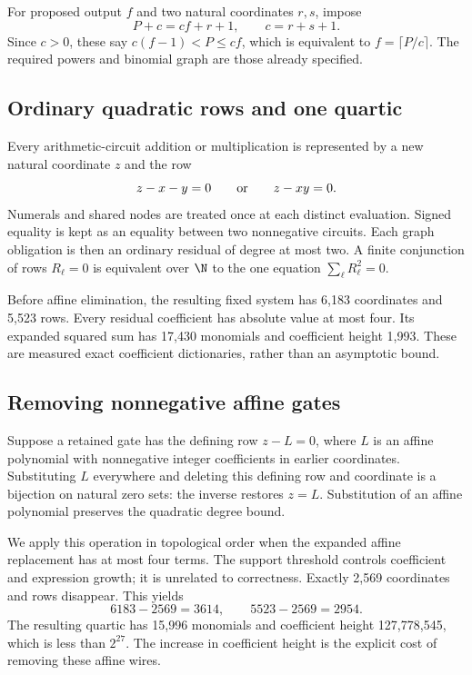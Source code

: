 For proposed output $f$ and two natural coordinates $r,s$, impose
\[
 P+c=cf+r+1,\qquad c=r+s+1.
\]
Since $c>0$, these say $c(f-1)<P\le cf$, which is equivalent to
$f=\lceil P/c\rceil$. The required powers and binomial graph are those
already specified.

\subsection{Ordinary quadratic rows and one quartic}

Every arithmetic-circuit addition or multiplication is represented by a
new natural coordinate $z$ and the row
\[
 z-x-y=0\qquad\hbox{or}\qquad z-xy=0.
\]
Numerals and shared nodes are treated once at each distinct evaluation.
Signed equality is kept as an equality between two nonnegative
circuits. Each graph obligation is then an ordinary residual of degree
at most two. A finite conjunction of rows $R_\ell=0$ is equivalent over
$\N$ to the one equation $\sum_\ell R_\ell^2=0$.

Before affine elimination, the resulting fixed system has 6,183
coordinates and 5,523 rows. Every residual coefficient has absolute
value at most four. Its expanded squared sum has 17,430 monomials and
coefficient height 1,993. These are measured exact coefficient
dictionaries, rather than an asymptotic bound.

\subsection{Removing nonnegative affine gates}

Suppose a retained gate has the defining row $z-L=0$, where $L$ is an
affine polynomial with nonnegative integer coefficients in earlier
coordinates. Substituting $L$ everywhere and deleting this defining
row and coordinate is a bijection on natural zero sets: the inverse
restores $z=L$. Substitution of an affine polynomial preserves the
quadratic degree bound.

We apply this operation in topological order when the expanded affine
replacement has at most four terms. The support threshold controls
coefficient and expression growth; it is unrelated to correctness.
Exactly 2,569 coordinates and rows disappear. This yields
\[
 6183-2569=3614,\qquad 5523-2569=2954.
\]
The resulting quartic has 15,996 monomials and coefficient height
127,778,545, which is less than $2^{27}$. The increase in coefficient
height is the explicit cost of removing these affine wires.

